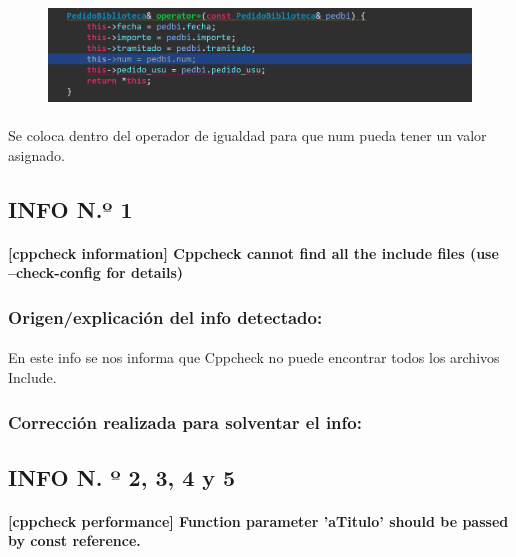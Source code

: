 			\begin{figure}[H]
				\centering
				\includegraphics[scale=0.55]{img/esteban9.png}
				\label{esteban9}
			\end{figure}
		
			\paragraph{}Se coloca dentro del operador de igualdad para que num pueda tener un valor asignado.
			
	\subsection{INFO N.º 1}
	
		\paragraph{[cppcheck information] Cppcheck cannot find all the include files (use --check-config for details)}
	
		\subsubsection{Origen/explicación del info detectado:}
		
			\paragraph{}En este info se nos informa que Cppcheck no puede encontrar todos los archivos Include.
			
		\subsubsection{Corrección realizada para solventar el info:}
		
	\subsection{INFO N. º 2, 3, 4 y 5 }
	
		\paragraph{[cppcheck performance] Function parameter 'aTitulo' should be passed by const reference.}
		
